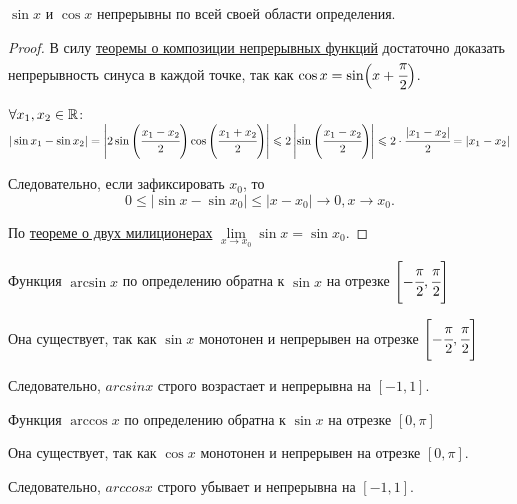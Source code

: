 \begin{theorem}
    $\sin x$ и $\cos x$ непрерывны по всей своей области определения.
\end{theorem}
\begin{proof}
    В силу \hyperlink{thrm4.18}{теоремы о композиции непрерывных функций} достаточно доказать непрерывность синуса в каждой точке, так как $\cos x = \sin \Bigl(x + \cfrac{\pi}{2} \Bigr)$.
    
    $\forall x_{1}, x_{2} \in \R$: $|\sin x_{1} - \sin x_{2}| = \left|2 \sin \left( \cfrac{x_{1} - x_{2}}{2} \right) \cos \left( \cfrac{x_{1} + x_{2}}{2} \right)\right| \leq 2 \left| \sin \left( \cfrac{x_{1} - x_{2}}{2} \right) \right| \leq 2 \cdot \cfrac{|x_{1} - x_{2}|}{2} = |x_{1} - x_{2}|$

    Следовательно, если зафиксировать $x_{0}$, то
    $$ 0 \leq |\sin x - \sin x_{0}| \leq |x - x_{0}| \to 0, x\to x_{0}.$$

    По \hyperlink{thm4.7}{теореме о двух милиционерах} $\lim\limits_{x \to x_{0}} \sin x = \sin x_{0}. $
\end{proof}

\begin{definition}
    Функция $\arcsin x$ по определению обратна к $\sin x$ на отрезке $\left[-\cfrac{\pi}{2}, \cfrac{\pi}{2}\right]$

    Она существует, так как $\sin x$ монотонен и непрерывен на отрезке $\left[-\cfrac{\pi}{2}, \cfrac{\pi}{2}\right]$ 

    Следовательно, $arcsin x$ строго возрастает и непрерывна на $[-1, 1].$
\end{definition}
\begin{definition}
    Функция $\arccos x$ по определению обратна к $\sin x$ на отрезке $\left[0, \pi\right]$

    Она существует, так как $\cos x$ монотонен и непрерывен на отрезке $\left[0, \pi\right]$.

    Следовательно, $arccos x$ строго убывает и непрерывна на $[-1, 1].$
\end{definition}

